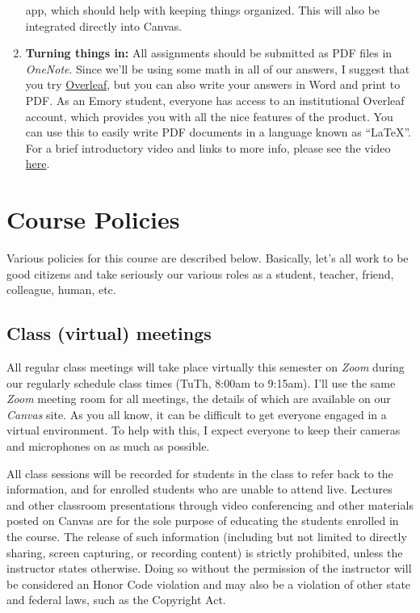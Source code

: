 \documentclass[11pt,]{article}
\begin{document}
\begin{enumerate}
  app, which should help with keeping things organized. This will also
  be integrated directly into Canvas.
\item
  \textbf{Turning things in:} All assignments should be submitted as PDF
  files in \emph{OneNote}. Since we'll be using some math in all of our
  answers, I suggest that you try
  \href{https://www.overleaf.com/}{Overleaf}, but you can also write
  your answers in Word and print to PDF. As an Emory student, everyone
  has access to an institutional Overleaf account, which provides you
  with all the nice features of the product. You can use this to easily
  write PDF documents in a language known as ``LaTeX''. For a brief
  introductory video and links to more info, please see the video
  \href{https://www.overleaf.com/learn/latex/Questions/Getting_started_with_LaTeX_and_Overleaf_(formerly_writeLaTeX)}{here}.
\end{enumerate}

\hypertarget{course-policies}{%
\section{Course Policies}\label{course-policies}}

Various policies for this course are described below. Basically, let's
all work to be good citizens and take seriously our various roles as a
student, teacher, friend, colleague, human, etc.

\hypertarget{class-virtual-meetings}{%
\subsection{Class (virtual) meetings}\label{class-virtual-meetings}}

All regular class meetings will take place virtually this semester on
\emph{Zoom} during our regularly schedule class times (TuTh, 8:00am to
9:15am). I'll use the same \emph{Zoom} meeting room for all meetings,
the details of which are available on our \emph{Canvas} site. As you all
know, it can be difficult to get everyone engaged in a virtual
environment. To help with this, I expect everyone to keep their cameras
and microphones on as much as possible.

All class sessions will be recorded for students in the class to refer
back to the information, and for enrolled students who are unable to
attend live. Lectures and other classroom presentations through video
conferencing and other materials posted on Canvas are for the sole
purpose of educating the students enrolled in the course. The release of
such information (including but not limited to directly sharing, screen
capturing, or recording content) is strictly prohibited, unless the
instructor states otherwise. Doing so without the permission of the
instructor will be considered an Honor Code violation and may also be a
violation of other state and federal laws, such as the Copyright Act.
\end{document}
